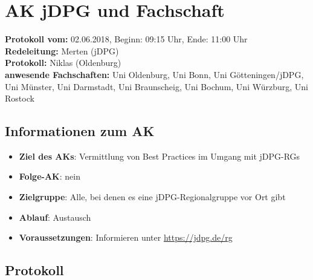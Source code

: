 
\section{AK jDPG und Fachschaft}

  \textbf{Protokoll vom:} 02.06.2018,
  Beginn: 09:15 Uhr,
  Ende: 11:00 Uhr \\
  \textbf{Redeleitung:} Merten (jDPG)\\
  \textbf{Protokoll:} Niklas (Oldenburg) \\
  \textbf{anwesende Fachschaften:} Uni Oldenburg, Uni Bonn, Uni Götteningen/jDPG, Uni Münster, Uni Darmstadt, Uni Braunscheig, Uni Bochum, Uni Würzburg, Uni Rostock

  \subsection*{Informationen zum AK}
    \begin{itemize}
      \item \textbf{Ziel des AKs}: Vermittlung von Best Practices im Umgang mit jDPG-RGs
      \item \textbf{Folge-AK}: nein
      \item \textbf{Zielgruppe}: Alle, bei denen es eine jDPG-Regionalgruppe vor Ort gibt
      \item \textbf{Ablauf}: Austausch
      \item \textbf{Voraussetzungen}: Informieren unter \url{https://jdpg.de/rg}
    \end{itemize}

  \subsection*{Protokoll}
